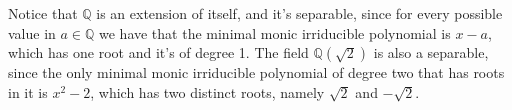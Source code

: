 \begin{example}
    Notice that $\mathbb{Q}$ is an extension of itself, and it's separable, since for every possible 
    value in $a \in \mathbb{Q}$ we have that the minimal monic irriducible polynomial is $x - a$, 
    which has one root and it's of degree 1. The field $\mathbb{Q}(\sqrt{2})$ is also a separable, 
    since the only minimal monic irriducible polynomial of degree two that has roots in it is $x^2 - 2$, 
    which has two distinct roots, namely $\sqrt{2}$ and $-\sqrt{2}$. 
\end{example}

\newpage
